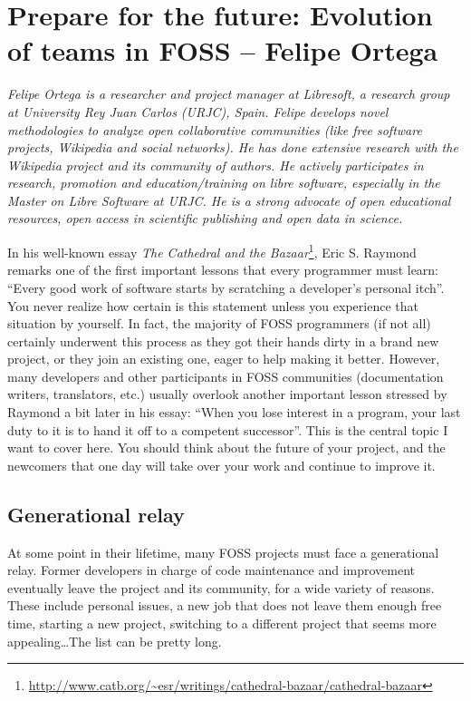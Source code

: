 \chapter{Prepare for the future: Evolution of teams in FOSS -- Felipe Ortega}

\textit{Felipe Ortega is a researcher and project manager at Libresoft, a research
group at University Rey Juan Carlos (URJC), Spain. Felipe develops novel
methodologies to analyze open collaborative communities (like free software
projects, Wikipedia and social networks). He has done extensive research with
the Wikipedia project and its community of authors. He actively participates in
research, promotion and education/training on libre software, especially in the
Master on Libre Software at URJC. He is a strong advocate of open educational
resources, open access in scientific publishing and open data in science.}

In his well-known essay \textit{The Cathedral and the
Bazaar}\footnote{\url{
http://www.catb.org/~esr/writings/cathedral-bazaar/cathedral-bazaar}}, Eric S.
Raymond remarks one of the first important lessons that every programmer must
learn: ``Every good work of software starts by scratching a developer's personal
itch''. You never realize how certain is this statement unless you experience
that situation by yourself. In fact, the majority of FOSS programmers (if not
all) certainly underwent this process as they got their hands dirty in a brand
new project, or they join an existing one, eager to help making it better.
However, many developers and other participants in FOSS communities
(documentation writers, translators, etc.) usually overlook another important
lesson stressed by Raymond a bit later in his essay: ``When you lose interest in
a program, your last duty to it is to hand it off to a competent successor''.
This is the central topic I want to cover here. You should think about the
future of your project, and the newcomers that one day will take over your work
and continue to improve it.

\section*{Generational relay}

At some point in their lifetime, many FOSS projects must face a generational
relay. Former developers in charge of code maintenance and improvement
eventually leave the project and its community, for a wide variety of reasons.
These include personal issues, a new job that does not leave them enough free
time, starting a new project, switching to a different project that seems more
appealing\dots The list can be pretty long.

